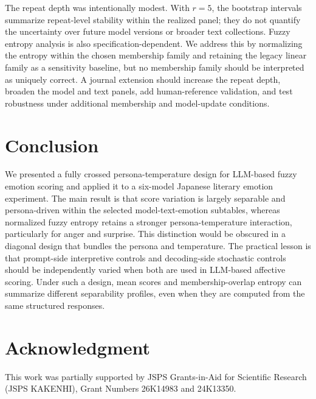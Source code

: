 \documentclass[conference]{IEEEtran}
\begin{document}
The repeat depth was intentionally modest.
With $r=5$, the bootstrap intervals summarize repeat-level stability within the realized panel; they do not quantify the uncertainty over future model versions or broader text collections.
Fuzzy entropy analysis is also specification-dependent.
We address this by normalizing the entropy within the chosen membership family and retaining the legacy linear family as a sensitivity baseline, but no membership family should be interpreted as uniquely correct.
A journal extension should increase the repeat depth, broaden the model and text panels, add human-reference validation, and test robustness under additional membership and model-update conditions.

\section{Conclusion}
We presented a fully crossed persona-temperature design for LLM-based fuzzy emotion scoring and applied it to a six-model Japanese literary emotion experiment.
The main result is that score variation is largely separable and persona-driven within the selected model-text-emotion subtables, whereas normalized fuzzy entropy retains a stronger persona-temperature interaction, particularly for anger and surprise.
This distinction would be obscured in a diagonal design that bundles the persona and temperature.
The practical lesson is that prompt-side interpretive controls and decoding-side stochastic controls should be independently varied when both are used in LLM-based affective scoring.
Under such a design, mean scores and membership-overlap entropy can summarize different separability profiles, even when they are computed from the same structured responses.

\section*{Acknowledgment}
This work was partially supported by JSPS Grants-in-Aid for Scientific Research (JSPS KAKENHI), Grant Numbers 26K14983 and 24K13350.
\end{document}
